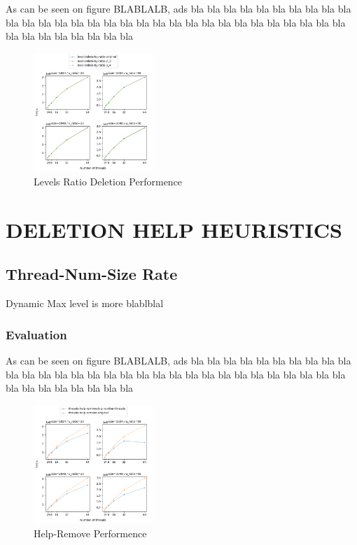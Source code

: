 \documentclass{article}
\begin{document}
As can be seen on figure BLABLALB, ads
bla bla bla bla bla bla
bla bla bla bla bla 
bla bla bla bla bla bla
bla bla bla bla bla 
bla bla bla bla bla bla
bla bla bla bla bla 
bla bla bla bla bla bla

\begin{figure}
	\caption{Levels Ratio Deletion Performence}
	\centering
	\includegraphics[width=0.4\textwidth]{level-delete-by-ratio_plot}
\end{figure}


\section{DELETION HELP HEURISTICS}
\label{sec:dhh}

\subsection{Thread-Num-Size Rate}
\label{ssec:tns}

Dynamic Max level is more blablblal

\subsubsection{Evaluation}
\label{sssec:tns-evl}

As can be seen on figure BLABLALB, ads
bla bla bla bla bla bla
bla bla bla bla bla 
bla bla bla bla bla bla
bla bla bla bla bla 
bla bla bla bla bla bla
bla bla bla bla bla 
bla bla bla bla bla bla

\begin{figure}
	\caption{Help-Remove Performence}
	\centering
	\includegraphics[width=0.4\textwidth]{help-remove_plot}
\end{figure}
\end{document}
